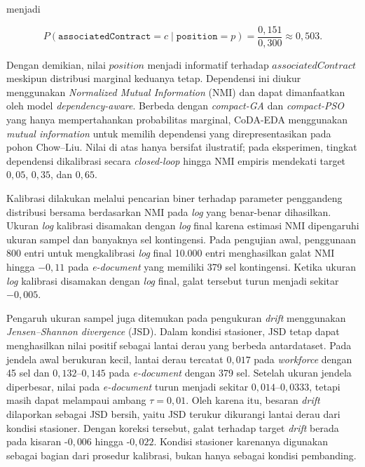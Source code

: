 menjadi

\begin{equation}
P(\texttt{associatedContract}=c \mid \texttt{position}=p)
=
\frac{0{,}151}{0{,}300}
\approx
0{,}503.
\end{equation}

Dengan demikian, nilai $position$ menjadi informatif terhadap $associatedContract$ meskipun distribusi marginal keduanya tetap. 
Dependensi ini diukur menggunakan \textit{Normalized Mutual Information} (NMI) dan dapat dimanfaatkan oleh model \textit{dependency-aware}. 
Berbeda dengan \textit{compact-GA} dan \textit{compact-PSO} yang hanya mempertahankan probabilitas marginal, CoDA-EDA menggunakan \textit{mutual information} untuk memilih dependensi yang direpresentasikan pada pohon Chow–Liu. 
Nilai di atas hanya bersifat ilustratif; pada eksperimen, tingkat dependensi dikalibrasi secara \textit{closed-loop} hingga NMI empiris mendekati target $0,05$, $0,35$, dan $0,65$.

Kalibrasi dilakukan melalui pencarian biner terhadap parameter penggandeng distribusi bersama berdasarkan NMI pada \textit{log} yang benar-benar dihasilkan. 
Ukuran \textit{log} kalibrasi disamakan dengan \textit{log} final karena estimasi NMI dipengaruhi ukuran sampel dan banyaknya sel kontingensi. 
Pada pengujian awal, penggunaan 800 entri untuk mengkalibrasi \textit{log} final 10.000 entri menghasilkan galat NMI hingga $-0,11$ pada \textit{e-document} yang memiliki 379 sel kontingensi. 
Ketika ukuran \textit{log} kalibrasi disamakan dengan \textit{log} final, galat tersebut turun menjadi sekitar $-0,005$.

Pengaruh ukuran sampel juga ditemukan pada pengukuran \textit{drift} menggunakan \textit{Jensen–Shannon divergence} (JSD). 
Dalam kondisi stasioner, JSD tetap dapat menghasilkan nilai positif sebagai lantai derau yang berbeda antardataset. 
Pada jendela awal berukuran kecil, lantai derau tercatat $0,017$ pada \textit{workforce} dengan 45 sel dan $0,132$–$0,145$ pada \textit{e-document} dengan 379 sel. 
Setelah ukuran jendela diperbesar, nilai pada \textit{e-document} turun menjadi sekitar $0,014$–$0,0333$, tetapi masih dapat melampaui ambang $\tau=0,01$. 
Oleh karena itu, besaran \textit{drift} dilaporkan sebagai JSD bersih, yaitu JSD terukur dikurangi lantai derau dari kondisi stasioner. 
Dengan koreksi tersebut, galat terhadap target \textit{drift} berada pada kisaran -$0,006$ hingga -$0,022$. 
Kondisi stasioner karenanya digunakan sebagai bagian dari prosedur kalibrasi, bukan hanya sebagai kondisi pembanding.


